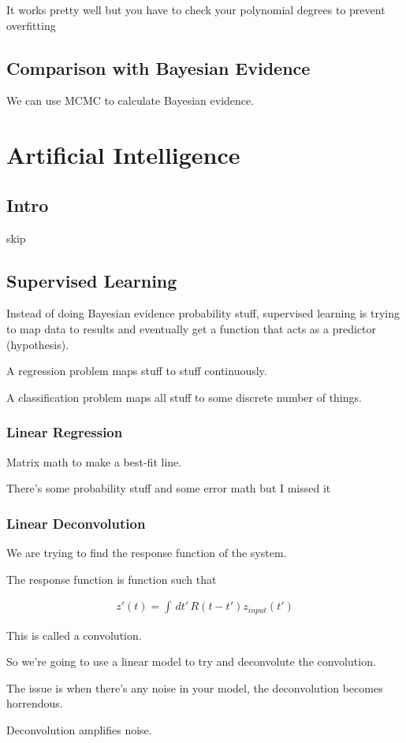 \documentclass[fleqn]{report}
\newcommand{\equations} [1] {
\begin{gather*}
#1
\end{gather*}
}
\begin{document}
It works pretty well but you have to check your polynomial degrees to 
prevent overfitting 

\section{Comparison with Bayesian Evidence}
We can use MCMC to calculate Bayesian evidence. 

\chapter{Artificial Intelligence}
\section{Intro}
skip 

\section{Supervised Learning}
Instead of doing Bayesian evidence probability stuff, supervised learning 
is trying to map data to results and eventually get a function that 
acts as a predictor (hypothesis).

A regression problem maps stuff to stuff continuously. 

A classification problem maps all stuff to some discrete number of things. 

\subsection{Linear Regression}
Matrix math to make a best-fit line. 

There's some probability stuff and some error math but I missed it 

\subsection{Linear Deconvolution}
We are trying to find the response function of the system. 

The response function is function such that 
\equations{
    z'(t) = 
    \int \, dt' \,
    R(t - t') z_{input}(t')
}
This is called a convolution. 

So we're going to use a linear model to try and deconvolute 
the convolution. 

The issue is when there's any noise in your model, the deconvolution 
becomes horrendous.

Deconvolution amplifies noise. 
\end{document}
